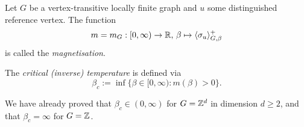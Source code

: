 \begin{definition}
    Let $G$ be a vertex-transitive locally finite graph and $u$ some distinguished reference vertex.
    The function
    \[
        m=m_G:[0,\infty)\to\mathbb R,\,\beta\mapsto\langle\sigma_u\rangle_{G,\beta}^+
    \]
    is called the \emph{magnetisation}.

    The \emph{critical (inverse) temperature} is defined via
    \[
        \beta_c:=\inf\{\beta\in[0,\infty):m(\beta)>0\}.
    \]
\end{definition}

We have already proved that $\beta_c\in(0,\infty)$ for $G=\mathbb Z^d$
in dimension $d\geq 2$,
and that $\beta_c=\infty$ for $G=\mathbb Z$.
